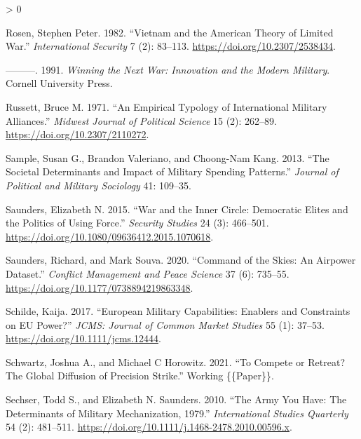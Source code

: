 \documentclass[
]{article}
\newlength{\cslhangindent}
\newenvironment{CSLReferences}[2] %
 {%
  \setlength{\parindent}{0pt}
  \ifodd #1 \everypar{\setlength{\hangindent}{\cslhangindent}}\ignorespaces\fi
  \ifnum #2 > 0
  \setlength{\parskip}{#2\baselineskip}
  \fi
 }%
 {}
\begin{document}
\begin{CSLReferences}{1}{0}
\leavevmode\hypertarget{ref-rosen_vietnamamericantheory_1982}{}%
Rosen, Stephen Peter. 1982. {``Vietnam and the {American Theory} of {Limited War}.''} \emph{International Security} 7 (2): 83--113. \url{https://doi.org/10.2307/2538434}.

\leavevmode\hypertarget{ref-rosen_winningnextwar_1991}{}%
---------. 1991. \emph{Winning the {Next War}: {Innovation} and the {Modern Military}}. {Cornell University Press}.

\leavevmode\hypertarget{ref-russett_empiricaltypologyinternational_1971}{}%
Russett, Bruce M. 1971. {``An {Empirical Typology} of {International Military Alliances}.''} \emph{Midwest Journal of Political Science} 15 (2): 262--89. \url{https://doi.org/10.2307/2110272}.

\leavevmode\hypertarget{ref-sample_societaldeterminantsimpact_2013}{}%
Sample, Susan G., Brandon Valeriano, and Choong-Nam Kang. 2013. {``The Societal Determinants and Impact of Military Spending Patterns.''} \emph{Journal of Political and Military Sociology} 41: 109--35.

\leavevmode\hypertarget{ref-saunders_warinnercircle_2015}{}%
Saunders, Elizabeth N. 2015. {``War and the {Inner Circle}: {Democratic Elites} and the {Politics} of {Using Force}.''} \emph{Security Studies} 24 (3): 466--501. \url{https://doi.org/10.1080/09636412.2015.1070618}.

\leavevmode\hypertarget{ref-saunders_commandskiesairpower_2020}{}%
Saunders, Richard, and Mark Souva. 2020. {``Command of the {Skies}: {An Airpower Dataset}.''} \emph{Conflict Management and Peace Science} 37 (6): 735--55. \url{https://doi.org/10.1177/0738894219863348}.

\leavevmode\hypertarget{ref-schilde_europeanmilitarycapabilities_2017}{}%
Schilde, Kaija. 2017. {``European {Military Capabilities}: {Enablers} and {Constraints} on {EU Power}?''} \emph{JCMS: Journal of Common Market Studies} 55 (1): 37--53. \url{https://doi.org/10.1111/jcms.12444}.

\leavevmode\hypertarget{ref-schwartz_competeretreatglobal_2021}{}%
Schwartz, Joshua A., and Michael C Horowitz. 2021. {``To {Compete} or {Retreat}? {The Global Diffusion} of {Precision Strike}.''} Working \{\{Paper\}\}.

\leavevmode\hypertarget{ref-sechser_armyyouhave_2010}{}%
Sechser, Todd S., and Elizabeth N. Saunders. 2010. {``The {Army You Have}: {The Determinants} of {Military Mechanization}, 1979{}.''} \emph{International Studies Quarterly} 54 (2): 481--511. \url{https://doi.org/10.1111/j.1468-2478.2010.00596.x}.


\end{CSLReferences}
\end{document}
